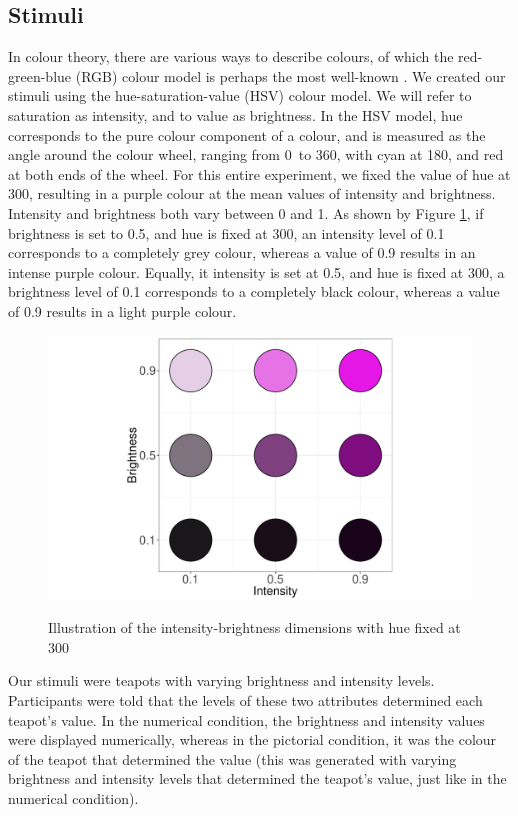 \documentclass[11pt,a4paper]{article}
\begin{document}
\subsection{Stimuli}

In colour theory, there are various ways to describe colours, of which the red-green-blue (RGB) colour model is perhaps the most well-known \cite{Colourtheory}. We created our stimuli using the hue-saturation-value (HSV) colour model. We will refer to saturation as intensity, and to value as brightness. In the HSV model, hue corresponds to the pure colour component of a colour, and is measured as the angle around the colour wheel, ranging from 0\degree\ to 360\degree, with cyan at 180\degree, and red at both ends of the wheel. For this entire experiment, we fixed the value of hue at 300\degree, resulting in a purple colour at the mean values of intensity and brightness. Intensity and brightness both vary between 0 and 1. As shown by Figure \ref{fig:explaincircle}, if brightness is set to 0.5, and hue is fixed at 300\degree, an intensity level of 0.1 corresponds to a completely grey colour, whereas a value of 0.9 results in an intense purple colour. Equally, it intensity is set at 0.5, and hue is fixed at 300\degree, a brightness level of 0.1 corresponds to a completely black colour, whereas a value of 0.9 results in a light purple colour.

\begin{figure}
\centering
\caption{Illustration of the intensity-brightness dimensions with hue fixed at 300\degree}
\includegraphics[width=1\textwidth]{./AE_teapots_Figure_1circles.pdf}
\label{fig:explaincircle}
\end{figure}

Our stimuli were teapots with varying brightness and intensity levels. Participants were told that the levels of these two attributes determined each teapot's value. In the numerical condition, the brightness and intensity values were displayed numerically, whereas in the pictorial condition, it was the colour of the teapot that determined the value (this was generated with varying brightness and intensity levels that determined the teapot's value, just like in the numerical condition).  
\end{document}
